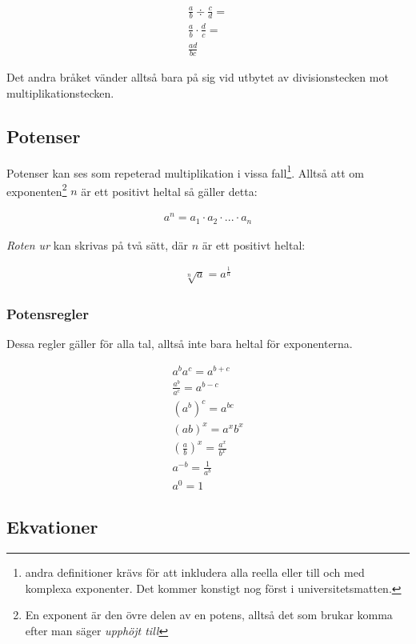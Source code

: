\begin{align}
	\frac{a}{b} \div\frac{c}{d} = \\ 
	\frac{a}{b} \cdot \frac{d}{c} = \\
	\frac{ad}{bc}
\end{align}

Det andra bråket vänder alltså bara på sig vid utbytet av divisionstecken mot multiplikationstecken.

\newpage
\subsection{Potenser}
\label{Potenser}

Potenser kan ses som repeterad multiplikation i vissa fall\footnote{andra definitioner krävs för att inkludera alla reella eller till och med komplexa exponenter. Det kommer konstigt nog först i universitetsmatten.}. Alltså att om exponenten\footnote{En exponent är den övre delen av en potens, alltså det som brukar komma efter man säger \textit{upphöjt till}} $n$ är ett positivt heltal så gäller detta:

\begin{align}
	a^n = a_1 \cdot a_2 \cdot ... \cdot a_n
\end{align}

\textit{Roten ur} kan skrivas på två sätt, där $n$ är ett positivt heltal:

\begin{align}
	\sqrt[n]{a} = a^{\frac{1}{n}}
\end{align}

\newpage
\subsubsection{Potensregler}


Dessa regler gäller för alla tal, alltså inte bara heltal för exponenterna.

\begin{align}
	a^ba^c = a^{b+c} \\
	\frac{a^b}{a^c} = a^{b-c} \\
	(a^b)^c=a^{bc} \\
	(ab)^x=a^xb^x \\
	\left(\frac{a}{b}\right)^x=\frac{a^x}{b^x} \\
	a^{-b} = \frac{1}{a^b} \\
	a^0 = 1
\end{align}

\newpage
\subsection{Ekvationer}

